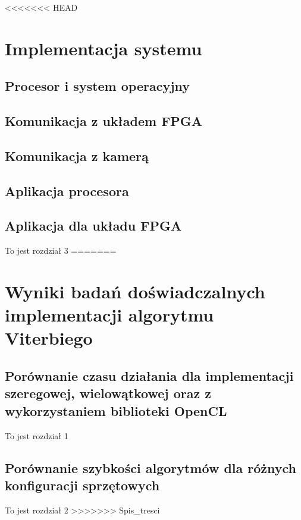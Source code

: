 \documentclass[document.tex]{subfiles}
\begin{document}
<<<<<<< HEAD
\chapter{Implementacja systemu}
\section{Procesor i system operacyjny}
\section{Komunikacja z układem FPGA}
\section{Komunikacja z kamerą}
\section{Aplikacja procesora}
\section{Aplikacja dla układu FPGA}
To jest rozdział 3
=======
\chapter{Wyniki badań doświadczalnych implementacji algorytmu Viterbiego}
\section{Porównanie czasu działania dla implementacji szeregowej, wielowątkowej
oraz z wykorzystaniem biblioteki OpenCL}
To jest rozdział 1

\section{Porównanie szybkości algorytmów dla różnych konfiguracji sprzętowych}
To jest rozdział 2
>>>>>>> Spis_tresci
\end{document}

